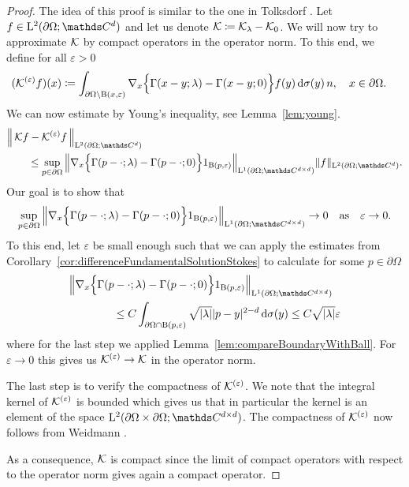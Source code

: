 \begin{proof}
  The idea of this proof is similar to the one in Tolksdorf \cite[Lem.\@~4.3.5]{tolksdorf}.
  Let $f \in \Ell^2(\partial\Omega; \C^d)$ and let us denote $\mathcal{K} \coloneqq \mathcal{K}_\lambda - \mathcal{K}_0$. 
  We will now try to approximate $\mathcal{K}$ by compact operators in the operator norm.
  To this end, we define for all $\varepsilon > 0$
  \begin{align*}
    &(\mathcal{K}^{(\varepsilon)}f)(x) 
    \coloneqq \int_{\partial\Omega \setminus \mathrm{B}(x,\varepsilon)} \nabla_x \Big\{ \Gamma(x - y; \lambda) - \Gamma(x - y; 0) \Big\} f(y) \, {\operatorname{d}\!{\sigma}}(y) \, n, \quad x \in \partial\Omega.
  \end{align*}
  We can now estimate by Young's inequality, see Lemma~\ref{lem:young}.
  \begin{align*}
    &\Big\| \,\K f - \K^{(\varepsilon)} f\, \Big\|_{\Ell^2(\partial\Omega; \C^d)} \\
    &\qquad\leq \sup_{p \in \partial\Omega} \Big\| \nabla_x \Big\{ \Gamma(p - \cdot; \lambda) - \Gamma(p - \cdot; 0) \Big\} 1_{\BB(p,\varepsilon)} \Big\|_{\Ell^1(\partial\Omega; \C^{d \times d})} \|f\|_{\Ell^2(\partial\Omega; \C^d)}.
  \end{align*}
  Our goal is to show that
  \begin{align*}
    \sup_{p \in \partial\Omega} \Big\| \nabla_x \Big\{ \Gamma(p - \cdot; \lambda) - \Gamma(p - \cdot; 0) \Big\} 1_{\BB(p,\varepsilon)} \Big\|_{\Ell^1(\partial\Omega; \C^{d \times d})} \to 0 \quad \text{as} \quad \varepsilon \to 0.
  \end{align*}
  To this end, let $\varepsilon$ be small enough such that we can apply the estimates from Corollary~\ref{cor:differenceFundamentalSolutionStokes} to calculate for some $p \in \partial\Omega$
  \begin{align*}
    &\Big\| \nabla_x \Big\{ \Gamma(p - \cdot; \lambda) - \Gamma(p - \cdot; 0) \Big\} 1_{\BB(p,\varepsilon)} \Big\|_{\Ell^1(\partial\Omega; \C^{d \times d})}  \\
     &\qquad\qquad\leq C \int_{\partial\Omega \cap \BB(p, \varepsilon)} \sqrt{|\lambda|} |p - y|^{2 - d} \d\sigma(y) 
     \leq C \sqrt{|\lambda|} \varepsilon
  \end{align*}
  where for the last step we applied Lemma~\ref{lem:compareBoundaryWithBall}.
  For $\varepsilon \to 0$ this gives us $\mathcal{K}^{(\varepsilon)} \to \mathcal{K}$ in the operator norm.

  The last step is to verify the compactness of $\mathcal{K}^{(\varepsilon)}$.
  We note that the integral kernel of $\mathcal{K}^{(\varepsilon)}$ is bounded which gives us that in particular the kernel is an element of the space $\Ell^2(\partial\Omega \times \partial\Omega; \C^{d \times d})$.
  The compactness of $\mathcal{K}^{(\varepsilon)}$ now follows from Weidmann \cite[Thm.\@~6.11]{weidmann}.

  As a consequence, $\mathcal{K}$ is compact since the limit of compact operators with respect to the operator norm gives again a compact operator.
\end{proof}

